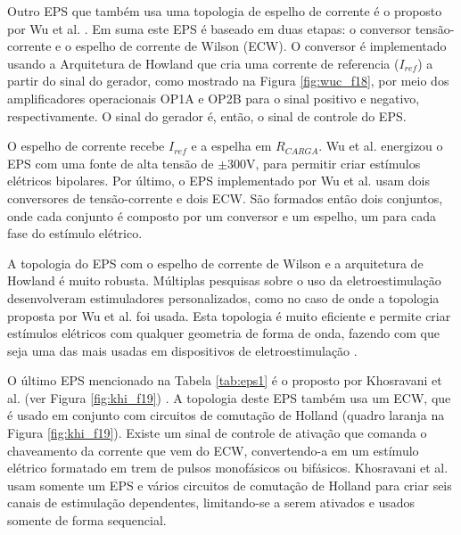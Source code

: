 Outro \acrshort{EPS} que também usa uma topologia de espelho de corrente é o proposto por Wu et al. \cite{Wu2002AApplications}. Em suma este \acrshort{EPS} é baseado em duas etapas: o conversor tensão-corrente e o espelho de corrente de Wilson (\acrshort{ECW}). O conversor é implementado usando a Arquitetura de Howland que cria uma corrente de referencia ($I_{ref}$) a partir do sinal do gerador, como mostrado na Figura \ref{fig:wuc_f18}, por meio dos amplificadores operacionais OP1A e OP2B para o sinal positivo e negativo, respectivamente. O sinal do gerador é, então, o sinal de controle do \acrshort{EPS}. 

O espelho de corrente recebe $I_{ref}$ e a espelha em $R_{CARGA}$. Wu et al. energizou o \acrshort{EPS} com uma fonte de alta tensão de $\pm$300V, para permitir criar estímulos elétricos bipolares. Por último, o \acrshort{EPS} implementado por Wu et al. usam dois conversores de tensão-corrente e dois \acrshort{ECW}. São formados então dois conjuntos, onde cada conjunto é composto por um conversor e um espelho, um para cada fase do estímulo elétrico.

A topologia do \acrshort{EPS} com o espelho de corrente de Wilson e a arquitetura de Howland é muito robusta. Múltiplas pesquisas sobre o uso da eletroestimulação desenvolveram estimuladores personalizados, como no caso de \cite{Faria2006ImplementacaoMedulares, Wu2002AApplications, Kaczmarek1991ASystem, DeLima2002AControl, NacimentoJunqueira2003EletroestimuladorDigital, Paredes2016DesenvolvimentoMusculoesqueletica}  onde a topologia proposta por Wu et al. foi usada. Esta topologia é muito eficiente e permite criar estímulos elétricos com qualquer geometria de forma de onda, fazendo com que seja uma das mais usadas em dispositivos de eletroestimulação \cite{Wu2002AApplications}. 

O último \acrshort{EPS} mencionado na Tabela \ref{tab:eps1} é o proposto por Khosravani et al. (ver Figura \ref{fig:khi_f19}) \cite{KhosravaniSanaz2011DevelopingSystem}. A topologia deste \acrshort{EPS} também usa um \acrshort{ECW}, que é usado em conjunto com circuitos de comutação de Holland (quadro laranja na Figura \ref{fig:khi_f19}). Existe um sinal de controle de ativação que comanda o chaveamento da corrente que vem do \acrshort{ECW}, convertendo-a em um estímulo elétrico formatado em trem de pulsos monofásicos ou bifásicos. Khosravani et al. usam somente um \acrshort{EPS} e vários circuitos de comutação de Holland para criar seis canais de estimulação dependentes, limitando-se a serem ativados e usados somente de forma sequencial.

